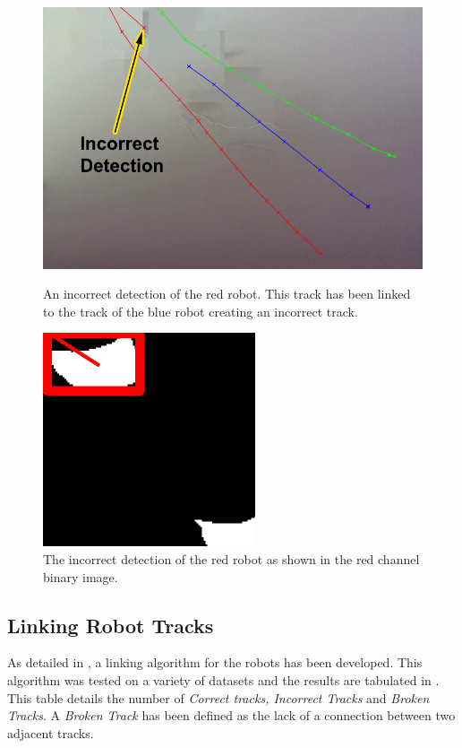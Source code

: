 \documentclass{article}
\begin{document}
\begin{figure}[h!]
\begin{minipage}[b]{0.5\linewidth}
\includegraphics[scale=0.5]{../Drawings/incorrectdetBackdata1.pdf}
\caption{An incorrect detection of the red robot. This track has been linked to the track of the blue robot creating an incorrect track.}
\label{fig:InDetectData2}
\end{minipage}
\hspace{0.5cm}
\begin{minipage}[b]{0.5\linewidth}
\includegraphics[scale=0.8]{../Drawings/incorrectdetrobotdata1.pdf}
\caption{The incorrect detection of the red robot as shown in the red channel binary image.}
\label{fig:redInDetect}
\end{minipage}
\end{figure}


\subsection{Linking Robot Tracks}
\label{sec:linking}
As detailed in , a linking algorithm for the robots has been developed. This algorithm was tested on a variety of datasets and the results are tabulated in . This table details the number of \textit{Correct tracks, Incorrect Tracks} and \textit{Broken Tracks}. A \textit{Broken Track} has been defined as the lack of a connection between two adjacent tracks. \\
\end{document}
